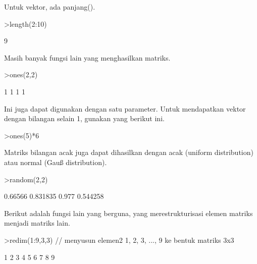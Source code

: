 \documentclass{article}
\begin{document}
\begin{eulernotebook}
\begin{eulercomment}
\begin{eulercomment}
\begin{eulercomment}
\begin{eulercomment}
\begin{eulercomment}
\begin{eulercomment}
\begin{eulercomment}
Untuk vektor, ada panjang().
\end{eulercomment}
\begin{eulerprompt}
>length(2:10)
\end{eulerprompt}
\begin{euleroutput}
  9
\end{euleroutput}
\begin{eulercomment}
Masih banyak fungsi lain yang menghasilkan matriks.
\end{eulercomment}
\begin{eulerprompt}
>ones(2,2)
\end{eulerprompt}
\begin{euleroutput}
              1             1 
              1             1 
\end{euleroutput}
\begin{eulercomment}
Ini juga dapat digunakan dengan satu parameter. Untuk mendapatkan
vektor dengan bilangan selain 1, gunakan yang berikut ini.
\end{eulercomment}
\begin{eulerprompt}
>ones(5)*6
\end{eulerprompt}
\begin{euleroutput}
  [6,  6,  6,  6,  6]
\end{euleroutput}
\begin{eulercomment}
Matriks bilangan acak juga dapat dihasilkan dengan acak (uniform
distribution) atau normal (Gauß distribution).
\end{eulercomment}
\begin{eulerprompt}
>random(2,2)
\end{eulerprompt}
\begin{euleroutput}
        0.66566      0.831835 
          0.977      0.544258 
\end{euleroutput}
\begin{eulercomment}
Berikut adalah fungsi lain yang berguna, yang merestrukturisasi elemen
matriks menjadi matriks lain.
\end{eulercomment}
\begin{eulerprompt}
>redim(1:9,3,3) // menyusun elemen2 1, 2, 3, ..., 9 ke bentuk matriks 3x3
\end{eulerprompt}
\begin{euleroutput}
              1             2             3 
              4             5             6 
              7             8             9 
\end{euleroutput}
\begin{eulercomment}

\end{eulercomment}
\end{eulercomment}
\end{eulercomment}
\end{eulercomment}
\end{eulercomment}
\end{eulercomment}
\end{eulercomment}
\end{eulernotebook}
\end{document}
